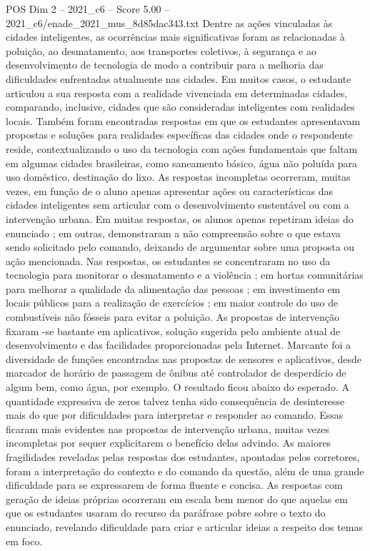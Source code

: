 \begin{textsample}{POS Dim 2 – 2021\_c6 – Score 5.00 – 2021\_c6/enade\_2021\_mus\_8d85dac343.txt}
Dentre as ações vinculadas às cidades inteligentes, as ocorrências mais significativas foram as relacionadas à poluição, ao desmatamento, aos transportes coletivos, à segurança e ao desenvolvimento de tecnologia de modo a contribuir para a melhoria das dificuldades enfrentadas atualmente nas cidades.
Em muitos casos, o estudante articulou a sua resposta com a realidade vivenciada em determinadas cidades, comparando, inclusive, cidades que são consideradas inteligentes com realidades locais.
Também foram encontradas respostas em que os estudantes apresentavam propostas e soluções para realidades específicas das cidades onde o respondente reside, contextualizando o uso da tecnologia com ações fundamentais que faltam em algumas cidades brasileiras, como saneamento básico, água não poluída para uso doméstico, destinação do lixo.
As respostas incompletas ocorreram, muitas vezes, em função de o aluno apenas apresentar ações ou características das cidades inteligentes sem articular com o desenvolvimento sustentável ou com a intervenção urbana.
Em muitas respostas, os alunos apenas repetiram ideias do enunciado ; em outras, demonstraram a não compreensão sobre o que estava sendo solicitado pelo comando, deixando de argumentar sobre uma proposta ou ação mencionada.
Nas respostas, os estudantes se concentraram no uso da tecnologia para monitorar o desmatamento e a violência ; em hortas comunitárias para melhorar a qualidade da alimentação das pessoas ; em investimento em locais públicos para a realização de exercícios ; em maior controle do uso de combustíveis não fósseis para evitar a poluição.
As propostas de intervenção fixaram -se bastante em aplicativos, solução sugerida pelo ambiente atual de desenvolvimento e das facilidades proporcionadas pela Internet.
Marcante foi a diversidade de funções encontradas nas propostas de sensores e aplicativos, desde marcador de horário de passagem de ônibus até controlador de desperdício de algum bem, como água, por exemplo.
O resultado ficou abaixo do esperado.
A quantidade expressiva de zeros talvez tenha sido consequência de desinteresse mais do que por dificuldades para interpretar e responder ao comando.
Essas ficaram mais evidentes nas propostas de intervenção urbana, muitas vezes incompletas por sequer explicitarem o benefício delas advindo.
As maiores fragilidades reveladas pelas respostas dos estudantes, apontadas pelos corretores, foram a interpretação do contexto e do comando da questão, além de uma grande dificuldade para se expressarem de forma fluente e concisa.
As respostas com geração de ideias próprias ocorreram em escala bem menor do que aquelas em que os estudantes usaram do recurso da paráfrase pobre sobre o texto do enunciado, revelando dificuldade para criar e articular ideias a respeito dos temas em foco.

\end{textsample}
